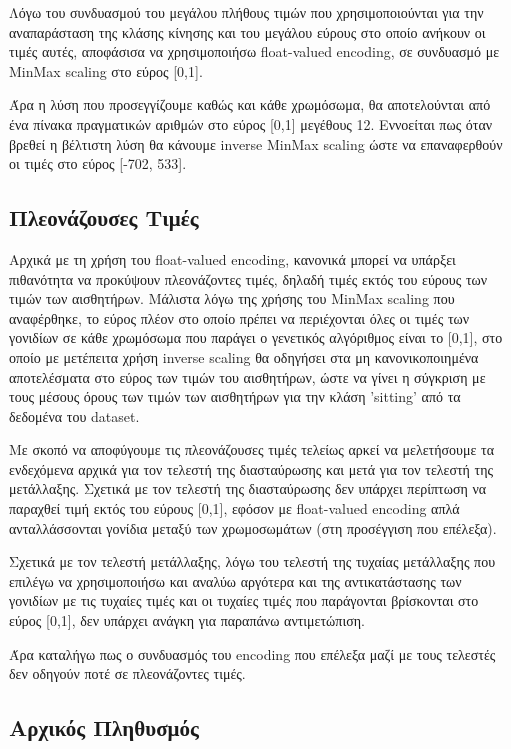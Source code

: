 \documentclass[12pt,a4paper]{article}
\begin{document}
Λόγω του συνδυασμού του μεγάλου πλήθους τιμών που χρησιμοποιούνται για την αναπαράσταση της κλάσης κίνησης και του μεγάλου εύρους στο οποίο ανήκουν οι τιμές αυτές, αποφάσισα να χρησιμοποιήσω float-valued encoding, σε συνδυασμό με MinMax scaling στο εύρος [0,1].

Άρα η λύση που προσεγγίζουμε καθώς και κάθε χρωμόσωμα, θα αποτελούνται από ένα πίνακα πραγματικών αριθμών στο εύρος [0,1] μεγέθους 12. Εννοείται πως όταν βρεθεί η βέλτιστη λύση θα κάνουμε inverse MinMax scaling ώστε να επαναφερθούν οι τιμές στο εύρος [-702, 533]. 

\subsection{Πλεονάζουσες Τιμές}

Αρχικά με τη χρήση του float-valued encoding, κανονικά μπορεί να υπάρξει πιθανότητα να προκύψουν πλεονάζοντες τιμές, δηλαδή τιμές εκτός του εύρους των τιμών των αισθητήρων. Μάλιστα λόγω της χρήσης του MinMax scaling που αναφέρθηκε, το εύρος πλέον στο οποίο πρέπει να περιέχονται όλες οι τιμές των γονιδίων σε κάθε χρωμόσωμα που παράγει ο γενετικός αλγόριθμος είναι το [0,1], στο οποίο με μετέπειτα χρήση inverse scaling θα οδηγήσει στα μη κανονικοποιημένα αποτελέσματα στο εύρος των τιμών του αισθητήρων, ώστε να γίνει η σύγκριση με τους μέσους όρους των τιμών των αισθητήρων για την κλάση 'sitting' από τα δεδομένα του dataset.

Με σκοπό να αποφύγουμε τις πλεονάζουσες τιμές τελείως αρκεί να μελετήσουμε τα ενδεχόμενα αρχικά για τον τελεστή της διασταύρωσης και μετά για τον τελεστή της μετάλλαξης. Σχετικά με τον τελεστή της διασταύρωσης δεν υπάρχει περίπτωση να παραχθεί τιμή εκτός του εύρους [0,1], εφόσον με float-valued encoding απλά ανταλλάσσονται γονίδια μεταξύ των χρωμοσωμάτων (στη προσέγγιση που επέλεξα).

Σχετικά με τον τελεστή μετάλλαξης, λόγω του τελεστή της τυχαίας μετάλλαξης που επιλέγω να χρησιμοποιήσω και αναλύω αργότερα και της αντικατάστασης των γονιδίων με τις τυχαίες τιμές και οι τυχαίες τιμές που παράγονται βρίσκονται στο εύρος [0,1], δεν υπάρχει ανάγκη για παραπάνω αντιμετώπιση.

Άρα καταλήγω πως ο συνδυασμός του encoding που επέλεξα μαζί με τους τελεστές δεν οδηγούν ποτέ σε πλεονάζοντες τιμές.

\subsection{Αρχικός Πληθυσμός}
\end{document}

